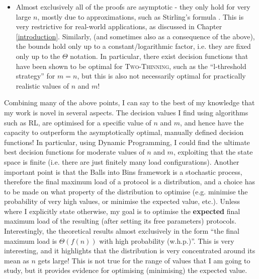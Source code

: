 \begin{itemize}
    \item
    Almost exclusively all of the proofs are asymptotic - they only hold for very large $n$, mostly due to approximations, such as Stirling's formula \cite{feldheim2021thinning}. This is very restrictive for real-world applications, as discussed in Chapter \ref{introduction}. Similarly, (and sometimes also as a consequence of the above), the bounds hold only up to a constant/logarithmic factor, i.e. they are fixed only up to the $\Theta$ notation. In particular, there exist decision functions that have been shown to be optimal for \textsc{Two-Thinning}, such as the ``l-threshold strategy'' for $m=n$, but this is also not necessarily optimal for practically realistic values of $n$ and $m$! 
\end{itemize}


Combining many of the above points, I can say to the best of my knowledge that my work is novel in several aspects. The decision values I find using algorithms such as RL, are optimised for a specific value of $n$ and $m$, and hence have the capacity to outperform the asymptotically optimal, manually defined decision functions! In particular, using Dynamic Programming, I could find the ultimate best decision functions for moderate values of $n$ and $m$, exploiting that the state space is finite (i.e. there are just finitely many load configurations). Another important point is that the Balls into Bins framework is a stochastic process, therefore the final maximum load of a protocol is a distribution, and a choice has to be made on what property of the distribution to optimise (e.g. minimise the probability of very high values, or minimise the expected value, etc.). Unless where I explicitly state otherwise, my goal is to optimise the \textbf{expected} final maximum load of the resulting (after setting its free parameters) protocols. Interestingly, the theoretical results almost exclusively in the form ``the final maximum load is $\Theta(f(n))$ with high probability (w.h.p.)''. This is very interesting, and it highlights that the distribution is very concentrated around its mean as $n$ gets large! This is not true for the range of values that I am going to study, but it provides evidence for optimising (minimising) the expected value. 

